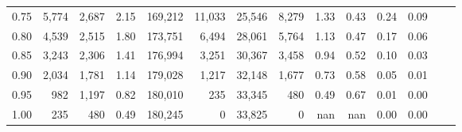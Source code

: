 \begin{tabular}{rrrrrrrrrrrrrr}
0.75 &   5,774 &  2,687 &    2.15 &  169,212 &   11,033 &  25,546 &   8,279 &  1.33 &  0.43 &  0.24 &      0.09 \\
0.80 &   4,539 &  2,515 &    1.80 &  173,751 &    6,494 &  28,061 &   5,764 &  1.13 &  0.47 &  0.17 &      0.06 \\
0.85 &   3,243 &  2,306 &    1.41 &  176,994 &    3,251 &  30,367 &   3,458 &  0.94 &  0.52 &  0.10 &      0.03 \\
0.90 &   2,034 &  1,781 &    1.14 &  179,028 &    1,217 &  32,148 &   1,677 &  0.73 &  0.58 &  0.05 &      0.01 \\
0.95 &     982 &  1,197 &    0.82 &  180,010 &      235 &  33,345 &     480 &  0.49 &  0.67 &  0.01 &      0.00 \\
1.00 &     235 &    480 &    0.49 &  180,245 &        0 &  33,825 &       0 &   nan &   nan &  0.00 &      0.00 \\
\bottomrule
\end{tabular}
